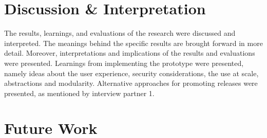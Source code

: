 \section*{Discussion \& Interpretation}

The results, learnings, and evaluations of the research were discussed and interpreted.
The meanings behind the specific results are brought forward in more detail.
Moreover, interpretations and implications of the results and evaluations were presented.
Learnings from implementing the prototype were presented, namely
ideas about the user experience, security considerations, the use at scale, abstractions and modularity.
Alternative approaches for promoting releases were presented, as mentioned by interview partner 1.
%
%
%
%

\section*{Future Work}

